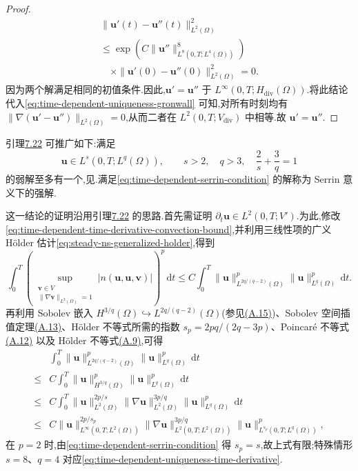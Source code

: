 \begin{lemma}[在更强正则性假设下弱解的唯一性]
\begin{proof}
\[
\begin{gathered}
  \|\bm{u}'(t)-\bm{u}''(t)\|_{L^2(\Omega)}^2
  \\
  \le \exp\!\left(C\|\bm{u}''\|_{L^8(0,T;L^4(\Omega))}^8\right)\\
  \quad\times\|\bm{u}'(0)-\bm{u}''(0)\|_{L^2(\Omega)}^2=0.
\end{gathered}
\]
因为两个解满足相同的初值条件.因此,$\bm{u}'=\bm{u}''$ 于
$L^\infty(0,T;H_{\mathrm{div}}(\Omega))$.将此结论代入\cref{eq:time-dependent-uniqueness-gronwall} 可知,对所有时刻均有
$\|\nabla(\bm{u}'-\bm{u}'')\|_{L^2(\Omega)}=0$,从而二者在 $L^2(0,T;V_{\mathrm{div}})$ 中相等.故 $\bm{u}'=\bm{u}''$.
\end{proof}
\end{lemma}

\begin{note}\label{note:time-dependent-serrin-uniqueness}
引理\hyperref[lem:time-dependent-weak-solution-uniqueness]{7.22} 可推广如下:满足
\begin{equation}\label{eq:time-dependent-serrin-condition}
  \bm{u}\in L^s(0,T;L^q(\Omega)),\qquad
  s>2,\quad q>3,\quad \frac{2}{s}+\frac{3}{q}=1
\end{equation}
的弱解至多有一个,见\textcite{Serrin1963}.满足\cref{eq:time-dependent-serrin-condition} 的解称为 Serrin 意义下的强解.

这一结论的证明沿用引理\hyperref[lem:time-dependent-weak-solution-uniqueness]{7.22} 的思路.首先需证明 $\partial_t\bm{u}\in L^2(0,T;V')$.为此,修改\cref{eq:time-dependent-time-derivative-convection-bound},并利用三线性项的广义 Hölder 估计\cref{eq:steady-ns-generalized-holder},得到
\[
  \int_0^T\left(
    \sup_{\substack{\bm{v}\in V\\
                    \|\nabla\bm{v}\|_{L^2(\Omega)}=1}}
      |n(\bm{u},\bm{u},\bm{v})|
  \right)^p\,\mathrm{d}t
  \le C\int_0^T
       \|\bm{u}\|_{L^{2q/(q-2)}(\Omega)}^p
       \|\bm{u}\|_{L^q(\Omega)}^p\,\mathrm{d}t.
\]
再利用 Sobolev 嵌入 $H^{3/q}(\Omega)\hookrightarrow L^{2q/(q-2)}(\Omega)$(参见\hyperref[eq:appendix-a-15]{(A.15)})、Sobolev 空间插值定理\hyperref[eq:appendix-a-13]{(A.13)}、Hölder 不等式所需的指数
$s_p=2pq/(2q-3p)$、Poincaré 不等式\hyperref[eq:appendix-a-12]{(A.12)} 以及 Hölder 不等式\hyperref[eq:appendix-a-9]{(A.9)},可得
\[
\begin{aligned}
  &\int_0^T\|\bm{u}\|_{L^{2q/(q-2)}(\Omega)}^p
         \|\bm{u}\|_{L^q(\Omega)}^p\,\mathrm{d}t\\
  \le{}&C\int_0^T\|\bm{u}\|_{H^{3/q}(\Omega)}^p
         \|\bm{u}\|_{L^q(\Omega)}^p\,\mathrm{d}t\\
  \le{}&C\int_0^T\|\bm{u}\|_{L^2(\Omega)}^{2p/s}
         \|\nabla\bm{u}\|_{L^2(\Omega)}^{3p/q}
         \|\bm{u}\|_{L^q(\Omega)}^p\,\mathrm{d}t\\
  \le{}&C\|\bm{u}\|_{L^\infty(0,T;L^2(\Omega))}^{2p/s_p}
         \|\nabla\bm{u}\|_{L^2(0,T;L^2(\Omega))}^{3p/q}
         \|\bm{u}\|_{L^{s_p}(0,T;L^q(\Omega))}^p,
\end{aligned}
\]
在 $p=2$ 时,由\cref{eq:time-dependent-serrin-condition} 得 $s_p=s$,故上式有限;特殊情形 $s=8$、$q=4$ 对应\cref{eq:time-dependent-uniqueness-time-derivative}.


\end{note}
